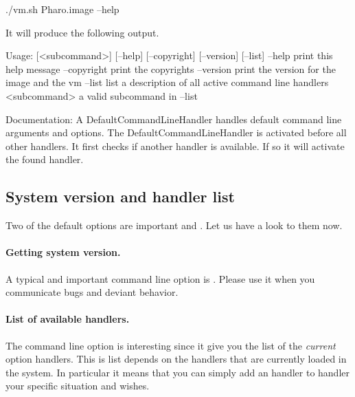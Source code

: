 \documentclass[a4paper,10pt,twoside]{book}
\begin{document}
\begin{code}{}
./vm.sh Pharo.image --help
\end{code}

It will produce the following output.

\begin{code}{}
Usage: [<subcommand>] [--help] [--copyright] [--version] [--list]
	--help print this help message
	--copyright print the copyrights
	--version print the version for the image and the vm
	--list list a description of all active command line handlers
	<subcommand> a valid subcommand in --list
	
Documentation:
A DefaultCommandLineHandler handles default command line arguments and options.
The DefaultCommandLineHandler is activated before all other handlers. 
It first checks if another handler is available. If so it will activate the found handler.
\end{code}


\subsection{System version and handler list}
Two of the default options are important  and . Let us have a look to them now.



\paragraph{Getting system version.} A typical and important command line option is . Please use it when you communicate bugs and deviant behavior. 


\paragraph{List of available handlers.} The command line option  is interesting since it give you the list of the \emph{current} option handlers. This is list depends on the handlers that are currently loaded in the system. In particular it means that you can simply add an handler to handler your specific situation and wishes.
\end{document}
